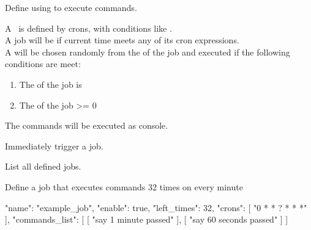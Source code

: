 \label{ch:command_scheduler}

Define  using  to execute commands.

A~ is defined by crons, with conditions like .\\
A job will be  if current time meets any of its cron expressions.\\
A  will be chosen randomly from the  of the job and executed if the following conditions are meet:
\begin{enumerate}
    \item The  of the job is 
    \item The  of the job >= 0
\end{enumerate}
The commands will be executed as console.

Immediately trigger a job.

List all defined jobs.

\begin{example}{Define a job that executes commands 32 times on every minute}
    \begin{json}
    {
        "name": "example_job",
        "enable": true,
        "left_times": 32,
        "crons": [
        "0 * * ? * * *"
        ],
        "commands_list": [
        [
        "say 1 minute passed"
        ],
        [
        "say 60 seconds passed"
        ]
        ]
    }
    \end{json}
\end{example}
